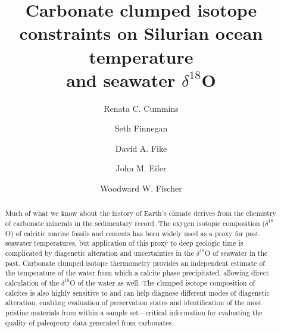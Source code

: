 \documentclass[5p, authoryear]{elsarticle}
\begin{document}
\begin{frontmatter}

\title{Carbonate clumped isotope constraints on Silurian ocean temperature \\and seawater $\delta^{18}$O}

\author[caltech]{Renata C. Cummins}

\author[berkley]{Seth Finnegan}

\author[washU]{David A. Fike}

\author[caltech]{John M. Eiler}

\author[caltech]{Woodward W. Fischer}


\address[caltech]{California Institute of Technology, Geological and Planetary Sciences, MC 100-23, Pasadena, CA 91125}

\address[berkley]{Department of Integrative Biology, University of California, 1005 Valley Life Sciences Bldg \#3140, Berkeley, CA 94720}

\address[washU]{Department of Earth and Planetary Sciences, Washington University, St. Louis, Missouri 63130}


\begin{abstract}

Much of what we know about the history of Earth's climate derives from the chemistry of carbonate minerals in the sedimentary record. The oxygen isotopic composition ($\delta^{18}$O) of calcitic marine fossils and cements has been widely used as a proxy for past seawater temperatures, but application of this proxy to deep geologic time is complicated by diagenetic alteration and uncertainties in the $\delta^{18}$O of seawater in the past. Carbonate clumped isotope thermometry provides an independent estimate of the temperature of the water from which a calcite phase precipitated, allowing direct calculation of the $\delta^{18}$O of the water as well. The clumped isotope composition of calcites is also highly sensitive to and can help diagnose different modes of diagenetic alteration, enabling evaluation of preservation states and identification of the most pristine materials from within a sample set---critical information for evaluating the quality of paleoproxy data generated from carbonates. 


\end{abstract}
\end{frontmatter}
\end{document}
